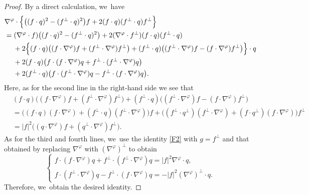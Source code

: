 \documentclass[11pt]{article}
\theoremstyle{definition}
\begin{document}
\begin{proof}
By a direct calculation, we~have
\begin{align*}
& \nabla^\varphi\cdot\Bigl\{ \bigl((f\cdot q)^2-(f^\perp\cdot q)^2 \bigr)f + 2(f\cdot q)(f^\perp\cdot q)f^\perp \Bigr\} \\
&= (\nabla^\varphi\cdot f)\bigl((f\cdot q)^2-(f^\perp\cdot q)^2 \bigr) + 2(\nabla^\varphi\cdot f^\perp)(f\cdot q)(f^\perp\cdot q) \\
&\quad\;
+ 2\Bigl\{ (f\cdot q)\bigl((f\cdot\nabla^\varphi)f + (f^\perp\cdot\nabla^\varphi)f^\perp \bigr)
+ (f^\perp\cdot q)\bigl((f^\perp\cdot\nabla^\varphi)f - (f\cdot\nabla^\varphi)f^\perp \bigr) \Bigr\}\cdot q \\
&\quad\;
+ 2(f\cdot q)\bigl(f\cdot(f\cdot\nabla^\varphi)q + f^\perp\cdot(f^\perp\cdot\nabla^\varphi)q \bigr)\\
&\quad\;
+ 2(f^\perp\cdot q)\bigl(f\cdot(f^\perp\cdot\nabla^\varphi)q - f^\perp\cdot(f\cdot\nabla^\varphi)q \bigr).
\end{align*}
Here, as for the second line in the right-hand side we see that
\begin{align*}
& (f\cdot q)\bigl((f\cdot\nabla^\varphi)f + (f^\perp\cdot\nabla^\varphi)f^\perp \bigr)
+ (f^\perp\cdot q)\bigl((f^\perp\cdot\nabla^\varphi)f - (f\cdot\nabla^\varphi)f^\perp \bigr) \\
&= \bigl((f\cdot q)(f\cdot\nabla^\varphi) + (f^\perp\!\cdot q)(f^\perp\cdot\nabla^\varphi) \bigr)f
+ \bigl((f^\perp\cdot q^\perp)(f^\perp\cdot\nabla^\varphi) + (f\cdot q^\perp)(f\cdot\nabla^\varphi) \bigr)f^\perp \\
&= |f|^2 \bigl((q\cdot\nabla^\varphi)f + (q^\perp\cdot\nabla^\varphi)f^\perp \bigr).
\end{align*}
As for the third and fourth lines, we~use the identity \eqref{F2} with $g=f^\perp$ and that obtained by replacing $\nabla^\varphi$ with $(\nabla^\varphi)^\perp$ to obtain
\[
\begin{cases}
f\cdot(f\cdot\nabla^\varphi)q + f^\perp\cdot(f^\perp\cdot\nabla^\varphi)q = |f|^2\nabla^\varphi\cdot q, \\
f\cdot(f^\perp\cdot\nabla^\varphi)q - f^\perp\cdot(f\cdot\nabla^\varphi)q = -|f|^2(\nabla^\varphi)^\perp\cdot q.
\end{cases}
\]
Therefore, we~obtain the desired identity.
\end{proof}
\end{document}

